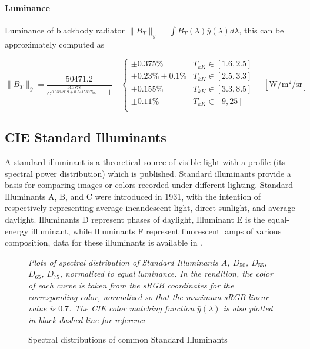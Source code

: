 \paragraph{Luminance}

Luminance of blackbody radiator $\|B_T\|_{\bar y} = \int B_T(\lambda)\bar y(\lambda) d\lambda$,
this can be approximately computed as

\begin{equation}
\|B_T\|_{\bar y} = \frac{\num{50471.2}}{e^{\frac{14.3878}{\num{0.0384919} +
\num{0.541533} T_{kK}}}-1}
\quad \left\{\begin{array}{cl}
\pm 0.375\% & T_{kK} \in [1.6, 2.5] \\
+0.23\% \pm 0.1\% & T_{kK} \in [2.5, 3.3] \\
\pm 0.155\% & T_{kK} \in [3.3, 8.5] \\
\pm 0.11\%  & T_{kK} \in [9, 25] \\
\end{array}\right.
\quad \left[\unit{\watt\per\square\meter\per\steradian}\right]
\end{equation}

\subsection{CIE Standard Illuminants}

A standard illuminant is a theoretical source of visible light with a profile
(its spectral
power distribution) which is published. Standard illuminants provide a basis for
comparing
images or colors recorded under different lighting. Standard Illuminants A, B,
and C were
introduced in 1931, with the intention of respectively representing average
incandescent light,
direct sunlight, and average daylight. Illuminants D represent phases of
daylight, Illuminant E
is the equal-energy illuminant, while Illuminants F represent fluorescent lamps
of various
composition, data for these illuminants is available in \cite{stdilluminants}.

\begin{figure}
{
\small
\centering

\caption{Spectral distributions of common Standard Illuminants}
\label{fig:illumspectra}
}
\vskip 1mm
{\footnotesize\it Plots of spectral distribution of
Standard Illuminants $A$, $D_{50}$, $D_{55}$, $D_{65}$, $D_{75}$,
normalized to equal luminance.
In the rendition, the color of each curve is taken from the
sRGB coordinates for the corresponding color,
normalized so that the maximum sRGB linear value is $0.7$.
The CIE color matching function $\bar y (\lambda)$ is also plotted in
black dashed line for reference}
\end{figure}

